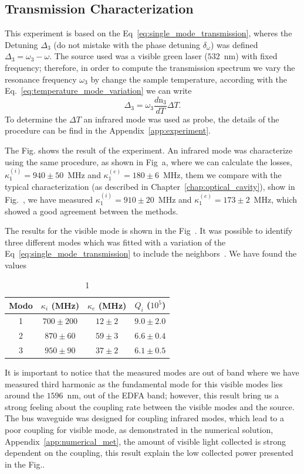 \subsection{Transmission Characterization}

This experiment is based on the Eq~\ref{eq:single_mode_transmission}, wheres the Detuning $\Delta_3$ (do not mistake with the phase detuning $\delta_\omega$) was defined $\Delta_3 = \omega_3 - \omega$. The source used was a visible green laser ($532$~nm) with fixed frequency; therefore, in order to compute the transmission spectrum we vary the resonance frequency $\omega_3$ by change the sample temperature, according with the Eq.~\ref{eq:temperature_mode_variation} we can write 
\begin{equation}
    \Delta_3 = \omega_3\frac{d\text{n}_3}{dT}\Delta T.
\end{equation}
To determine the $\Delta T$ an infrared mode was used as probe, the details of the procedure can be find in the Appendix~\ref{app:experiment}.

The Fig. shows the result of the experiment. An infrared mode was characterize using the same procedure, as shown in Fig~a, where we can calculate the losses, $\kappa_1^{(i)} = 940\pm 50$~MHz and $\kappa_1^{(e)} = 180 \pm 6$~MHz, them we compare with the typical characterization (as described in Chapter~\ref{chap:optical_cavity}), show in Fig.~, we have measured $\kappa_1^{(i)} = 910\pm 20$~MHz and $\kappa_1^{(e)} = 173 \pm 2$~MHz, which showed a good agreement between the methods.

The results for the visible mode is shown in the Fig~. It was possible to identify three different modes which was fitted with a variation of the Eq~\ref{eq:single_mode_transmission} to include the neighbors~\needcit. We have found the values
\begin{table}[h]
\centering
\begin{tabularx}{8cm}{c|c|c|c}
Modo & $\kappa_i$ (MHz) & $\kappa_e$ (MHz) & $Q_i$ ($10^5$) \\ 
\hline                               
1 &$700\pm200$&$12\pm2$&$9.0\pm2.0$\\
2 &$870\pm60$&$59\pm3$&$6.6\pm0.4$\\
3 &$950\pm90$&$37\pm2$&$6.1\pm0.5$
\end{tabularx}
\caption{1}
\end{table}

It is important to notice that the measured modes are out of band where we have measured third harmonic as the fundamental mode for this visible modes lies around the $1596$~nm, out of the EDFA band; however, this result bring us a strong feeling about the coupling rate between the visible modes and the source. The bus waveguide was designed for coupling infrared modes, which lead to a poor coupling for visible mode, as demonstrated in the numerical solution, Appendix~\ref{app:numerical_met}, the amount of visible light collected is strong dependent on the coupling, this result explain the low collected power presented in the Fig..

